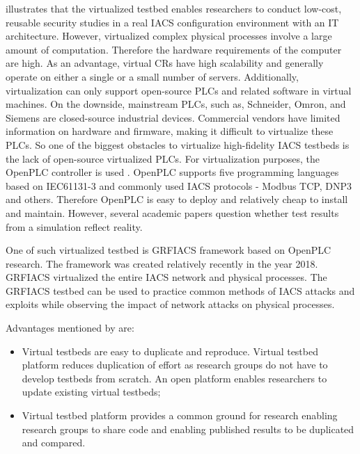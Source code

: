 \citeauthor{01-surway} \parencite{01-surway} illustrates that the virtualized testbed enables researchers to conduct low-cost, reusable security studies in a real IACS configuration environment with an IT architecture. However, virtualized complex physical processes involve a large amount of computation. Therefore the hardware requirements of the computer are high. As an advantage, virtual CRs have high scalability and generally operate on either a single or a small number of servers.  Additionally, virtualization can only support open-source PLCs and related software in virtual machines. On the downside, mainstream PLCs, such as, Schneider, Omron, and Siemens are closed-source industrial devices. Commercial vendors have limited information on hardware and firmware, making it difficult to virtualize these PLCs. So one of the biggest obstacles to virtualize high-fidelity IACS testbeds is the lack of open-source virtualized PLCs.  For virtualization purposes, the OpenPLC controller is used \parencite{38-ieee-openplc.pdf}. OpenPLC supports five programming languages based on IEC61131-3 \parencite{WEB-14-plc-languages} and commonly used IACS protocols - Modbus TCP, DNP3 and others. Therefore OpenPLC is easy to deploy and relatively cheap to install and maintain. However, several academic papers question whether test results from a simulation reflect reality.

One of such virtualized testbed is GRFIACS framework \parencite{39-grfics-scada-simulator} based on OpenPLC \parencite{38-ieee-openplc.pdf} research. The framework was created relatively recently in the year 2018. GRFIACS virtualized the entire IACS network and physical processes. The GRFIACS testbed can be used to practice common methods of IACS attacks and exploits while observing the impact of network attacks on physical processes.

Advantages mentioned by \citeauthor{03-testbeds} \parencite{03-testbeds} are:

\begin{itemize}
	\item Virtual testbeds are easy to duplicate and reproduce. Virtual testbed platform reduces duplication of effort as research groups do not have to develop testbeds from scratch. An open platform enables researchers to update existing virtual testbeds;
	
	\item Virtual testbed platform provides a common ground for research enabling research groups to share code and enabling published results to be duplicated and compared.
	
\end{itemize}


